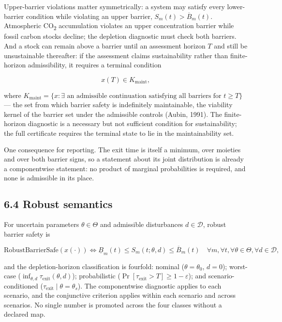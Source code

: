 \documentclass[11pt]{article}
\begin{document}
Upper-barrier violations matter symmetrically: a system may satisfy every lower-barrier condition while violating an upper barrier, \(S_m(t) > \overline{B}_m(t)\). Atmospheric CO\textsubscript{2} accumulation violates an upper concentration barrier while fossil carbon stocks decline; the depletion diagnostic must check both barriers. And a stock can remain above a barrier until an assessment horizon \(T\) and still be unsustainable thereafter: if the assessment claims sustainability rather than finite-horizon admissibility, it requires a terminal condition 

$$x(T) \in K_{\mathrm{maint}},$$

 where \(K_{\mathrm{maint}} =\allowbreak{} \{ x : \exists \text{ an admissible continuation satisfying all barriers for } t \ge T \}\) --- the set from which barrier safety is indefinitely maintainable, the viability kernel of the barrier set under the admissible controls (Aubin, 1991). The finite-horizon diagnostic is a necessary but not sufficient condition for sustainability; the full certificate requires the terminal state to lie in the maintainability set.

One consequence for reporting. The exit time is itself a minimum, over moieties and over both barrier signs, so a statement about its joint distribution is already a componentwise statement: no product of marginal probabilities is required, and none is admissible in its place.

\subsection*{6.4 Robust semantics}\label{64-robust-semantics}

For uncertain parameters \(\theta \in \Theta\) and admissible disturbances \(d \in \mathcal{D}\), robust barrier safety is 

$$\mathrm{RobustBarrierSafe}(x(\cdot)) \iff \underline{B}_m(t) \le S_m(t; \theta, d) \le \overline{B}_m(t) \quad \forall m, \forall t, \forall \theta \in \Theta, \forall d \in \mathcal{D},$$

 and the depletion-horizon classification is fourfold: nominal (\(\theta = \theta_0\), \(d = 0\)); worst-case (\(\inf_{\theta,\allowbreak{}d} \tau_{\mathrm{exit}}(\theta,\allowbreak{}d)\)); probabilistic (\(\Pr[\tau_{\mathrm{exit}} > T] \ge 1 - \varepsilon\)); and scenario-conditioned (\(\tau_{\mathrm{exit}} \mid \theta =\allowbreak{} \theta_s\)). The componentwise diagnostic applies to each scenario, and the conjunctive criterion applies within each scenario and across scenarios. No single number is promoted across the four classes without a declared map.
\end{document}
